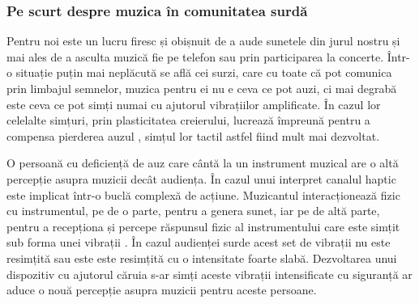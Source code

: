 \documentclass[../IoMusT.tex]{subfiles}
\begin{document}
\subsubsection{Pe scurt despre muzica în comunitatea surdă}
Pentru noi este un lucru firesc și obișnuit de a aude sunetele din jurul nostru și mai ales de a asculta muzică fie pe telefon sau prin participarea la concerte. Într-o situație puțin mai neplăcută se află cei surzi, care cu toate că pot comunica prin limbajul semnelor, muzica pentru ei nu e ceva ce pot auzi, ci mai degrabă este ceva ce pot simți numai cu ajutorul vibrațiilor amplificate. În cazul lor celelalte simțuri, prin plasticitatea creierului, lucrează împreună pentru a compensa pierderea auzul \cite{DEAF}, simțul lor tactil astfel fiind mult mai dezvoltat. 
\\
\par O persoană cu deficiență de auz care cântă la un instrument muzical are o altă percepție asupra muzicii decât audiența. În cazul unui interpret canalul haptic este implicat într-o buclă complexă de acțiune. Muzicantul interacționează fizic cu instrumentul, pe de o parte, pentru a genera sunet, iar pe de altă parte, pentru a recepționa și percepe răspunsul fizic al instrumentului care este simțit sub forma unei vibrații \cite{Haptic}. În cazul audienței surde acest set de vibrații nu este resimțită sau este este resimțită cu o intensitate foarte slabă. Dezvoltarea unui dispozitiv cu ajutorul căruia s-ar simți aceste vibrații intensificate cu siguranță ar aduce o nouă percepție asupra muzicii pentru aceste persoane.
\end{document}
